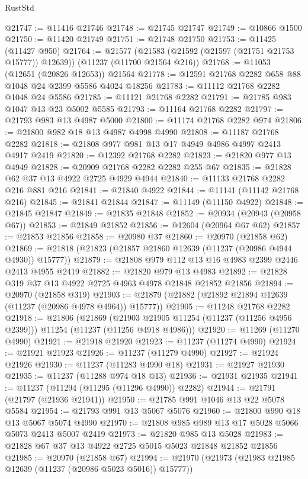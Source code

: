 \begin{lexlean}{RustStd}
\begin{coremodule}
@21747 := @11416 @21746
@21748 := @21745 @21747
@21749 := @10866 @1500
@21750 := @11420 @21749
@21751 := @21748 @21750
@21753 := @11425 (@11427 @950)
@21764 := @21577
    (@21583 (@21592 (@21597 (@21751 @21753 @15777)) @12639))
    (@11237 (@11700 @21564 @216))
@21768 := @11053 (@12651 (@20826 @12653)) @21564
@21778 := @12591 @21768 @2282 @658 @88 @1048 @24 @2399 @5586 @4024 @18256
@21783 := @11112 @21768 @2282 @1048 @24 @5586
@21785 := @11121 @21768 @2282
@21791 := @21785 @983 @1047 @13 @23 @5002 @5585
@21793 := @11164 @21768 @2282
@21797 := @21793 @983 @13 @4987 @5000
@21800 := @11174 @21768 @2282 @974
@21806 := @21800 @982 @18 @13 @4987 @4998 @4990
@21808 := @11187 @21768 @2282
@21818 := @21808 @977 @981 @13 @17 @4949 @4986 @4997 @2413 @4917 @2419
@21820 := @12392 @21768 @2282
@21823 := @21820 @977 @13 @4949
@21828 := @20909 @21768 @2282 @2282 @255 @67
@21835 := @21828 @62 @37 @13 @4922 @2725 @4929 @4944
@21840 := @11133 @21768 @2282 @216 @881 @216
@21841 := @21840 @4922
@21844 := @11141 (@11142 @21768 @216)
@21845 := @21841 @21844
@21847 := @11149 (@11150 @4922)
@21848 := @21845 @21847
@21849 := @21835 @21848
@21852 := @20934 (@20943 (@20958 @67))
@21853 := @21849 @21852
@21856 := @12604 (@20964 @67 @62)
@21857 := @21853 @21856
@21858 := @20980 @37
@21860 := @20970 (@21858 @62)
@21869 := @21818 (@21823 (@21857 @21860 @12639 (@11237 (@20986 @4944 @4930)) @15777))
@21879 := @21808 @979 @112 @13 @16 @4983 @2399 @2446 @2413 @4955 @2419
@21882 := @21820 @979 @13 @4983
@21892 := @21828 @319 @37 @13 @4922 @2725 @4963 @4978 @21848 @21852 @21856
@21894 := @20970 (@21858 @319)
@21903 := @21879 (@21882 (@21892 @21894 @12639 (@11237 (@20986 @4978 @4964)) @15777))
@21905 := @11248 @21768 @2282
@21918 := @21806
    (@21869
      (@21903 @21905 @11254 (@11237 (@11256 @4956 @2399)))
      @11254
      (@11237 (@11256 @4918 @4986)))
@21920 := @11269 (@11270 @4990)
@21921 := @21918 @21920
@21923 := @11237 (@11274 @4990)
@21924 := @21921 @21923
@21926 := @11237 (@11279 @4990)
@21927 := @21924 @21926
@21930 := @11237 (@11283 @4990 @18)
@21931 := @21927 @21930
@21935 := @11237 (@11288 @974 @18 @13)
@21936 := @21931 @21935
@21941 := @11237 (@11294 (@11295 (@11296 @4990)) @2282)
@21944 := @21791 (@21797 (@21936 @21941))
@21950 := @21785 @991 @1046 @13 @22 @5078 @5584
@21954 := @21793 @991 @13 @5067 @5076
@21960 := @21800 @990 @18 @13 @5067 @5074 @4990
@21970 := @21808 @985 @989 @13 @17 @5028 @5066 @5073 @2413 @5007 @2419
@21973 := @21820 @985 @13 @5028
@21983 := @21828 @67 @37 @13 @4922 @2725 @5015 @5023 @21848 @21852 @21856
@21985 := @20970 (@21858 @67)
@21994 := @21970 (@21973 (@21983 @21985 @12639 (@11237 (@20986 @5023 @5016)) @15777))

\end{coremodule}
\end{lexlean}
